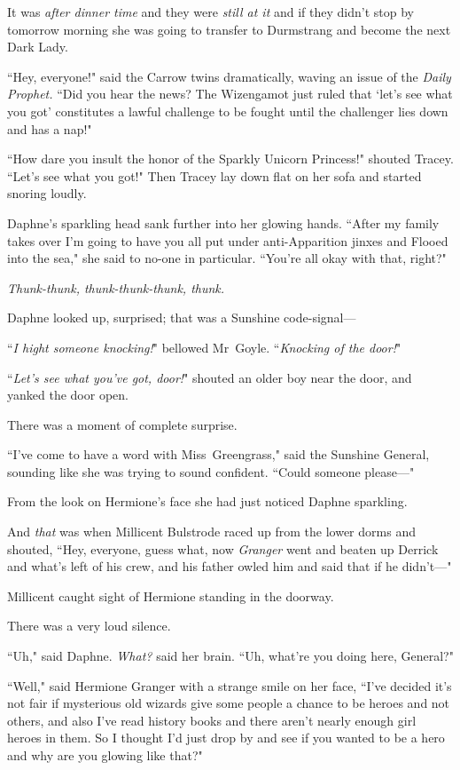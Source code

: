 It was \emph{after dinner time} and they were \emph{still at it} and if they didn't stop by tomorrow morning she was going to transfer to Durmstrang and become the next Dark Lady.

``Hey, everyone!" said the Carrow twins dramatically, waving an issue of the \emph{Daily Prophet.} ``Did you hear the news? The Wizengamot just ruled that `let's see what you got' constitutes a lawful challenge to be fought until the challenger lies down and has a nap!"

``How dare you insult the honor of the Sparkly Unicorn Princess!" shouted Tracey. ``Let's see what you got!" Then Tracey lay down flat on her sofa and started snoring loudly.

Daphne's sparkling head sank further into her glowing hands. ``After my family takes over I'm going to have you all put under anti-Apparition jinxes and Flooed into the sea," she said to no-one in particular. ``You're all okay with that, right?"

\emph{Thunk-thunk, thunk-thunk-thunk, thunk.}

Daphne looked up, surprised; that was a Sunshine code-signal—

``\emph{I hight someone knocking!}" bellowed Mr~Goyle. ``\emph{Knocking of the door!}"

``\emph{Let's see what you've got, door!}" shouted an older boy near the door, and yanked the door open.

There was a moment of complete surprise.

``I've come to have a word with Miss~Greengrass," said the Sunshine General, sounding like she was trying to sound confident. ``Could someone please—"

From the look on Hermione's face she had just noticed Daphne sparkling.

And \emph{that} was when Millicent Bulstrode raced up from the lower dorms and shouted, ``Hey, everyone, guess what, now \emph{Granger} went and beaten up Derrick and what's left of his crew, and his father owled him and said that if he didn't—"

Millicent caught sight of Hermione standing in the doorway.

There was a very loud silence.

``Uh," said Daphne. \emph{What?} said her brain. ``Uh, what're you doing here, General?"

``Well," said Hermione Granger with a strange smile on her face, ``I've decided it's not fair if mysterious old wizards give some people a chance to be heroes and not others, and also I've read history books and there aren't nearly enough girl heroes in them. So I thought I'd just drop by and see if you wanted to be a hero and why are you glowing like that?"

